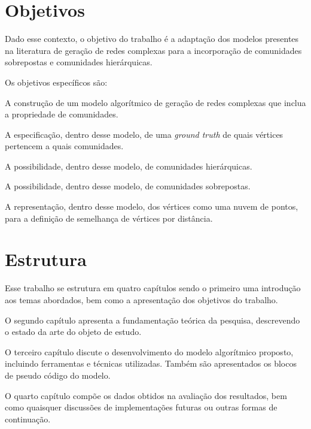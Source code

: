 \documentclass[notes.tex]{subfiles}
\begin{document}
\section{Objetivos}

Dado esse contexto, o objetivo do trabalho é a adaptação dos modelos presentes na literatura de geração de redes complexas para a incorporação de comunidades sobrepostas e comunidades hierárquicas.

Os objetivos específicos são:

\begin{alineas}
    \item A construção de um modelo algorítmico de geração de redes complexas que inclua a propriedade de comunidades.
    \item A especificação, dentro desse modelo,  de uma \emph{ground truth} de quais vértices pertencem a quais comunidades.
    \item A possibilidade, dentro desse modelo, de comunidades hierárquicas.
    \item A possibilidade, dentro desse modelo, de comunidades sobrepostas.
    \item A representação, dentro desse modelo, dos vértices como uma nuvem de pontos, para a definição de semelhança de vértices por distância.
\end{alineas}

\section{Estrutura}

Esse trabalho se estrutura em quatro capítulos sendo o primeiro uma introdução aos temas abordados, bem como a apresentação dos objetivos do trabalho.

O segundo capítulo apresenta a fundamentação teórica da pesquisa, descrevendo o estado da arte do objeto de estudo.

O terceiro capítulo discute o desenvolvimento do modelo algorítmico proposto, incluindo ferramentas e técnicas utilizadas.
Também são apresentados os blocos de pseudo código do modelo.

O quarto capítulo compõe os dados obtidos na avaliação dos resultados, bem como quaisquer discussões de implementações futuras ou outras formas de continuação.
\end{document}
